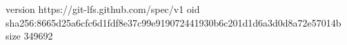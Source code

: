 version https://git-lfs.github.com/spec/v1
oid sha256:8665d25a6cfc6d1fdf8e37c99e919072441930b6c201d1d6a3d0d8a72e57014b
size 349692
